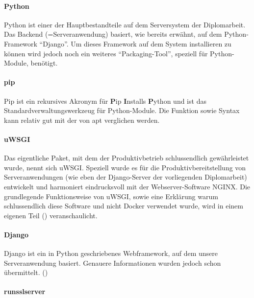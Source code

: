 \documentclass[
]{article}
\begin{document}
\hypertarget{python}{%
\paragraph{Python}\label{python}}

Python ist einer der Hauptbestandteile auf dem Serversystem der
Diplomarbeit. Das Backend (=Serveranwendung) basiert, wie bereits
erwähnt, auf dem Python-Framework ``Django''. Um dieses Framework auf
dem System installieren zu können wird jedoch noch ein weiteres
``Packaging-Tool'', speziell für Python-Module, benötigt.

\hypertarget{pip}{%
\paragraph{pip}\label{pip}}

Pip ist ein rekursives Akronym für \textbf{P}ip \textbf{I}nstalls
\textbf{P}ython und ist das Standardverwaltungswerkzeug für
Python-Module. Die Funktion sowie Syntax kann relativ gut mit der von
apt verglichen werden.

\hypertarget{uwsgi}{%
\paragraph{uWSGI}\label{uwsgi}}

Das eigentliche Paket, mit dem der Produktivbetrieb schlussendlich
gewährleistet wurde, nennt sich uWSGI. Speziell wurde es für die
Produktivbereitstellung von Serveranwendungen (wie eben der
Django-Server der vorliegenden Diplomarbeit) entwickelt und harmoniert
eindrucksvoll mit der Webserver-Software NGINX. Die grundlegende
Funktionsweise von uWSGI, sowie eine Erklärung warum schlussendlich
diese Software und nicht Docker verwendet wurde, wird in einem eigenen
Teil () veranschaulicht.

\hypertarget{django}{%
\paragraph{Django}\label{django}}

Django ist ein in Python geschriebenes Webframework, auf dem unsere
Serveranwendung basiert. Genauere Informationen wurden jedoch schon
übermittelt.
()

\hypertarget{runsslserver}{%
\paragraph{runsslserver}\label{runsslserver}}
\end{document}
